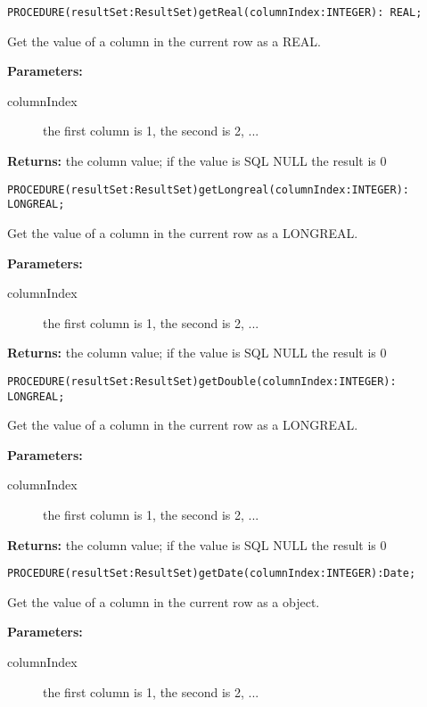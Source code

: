\verb'PROCEDURE(resultSet:ResultSet)getReal(columnIndex:INTEGER): REAL;'

     Get the value of a column in the current row as a REAL. 
     
     {\bf Parameters: } 
\begin{description}
\item[columnIndex] the first column is 1, the second is 2, ... 
\end{description}

     {\bf Returns: } 
          the column value; if the value is SQL NULL the result is 0 


\verb'PROCEDURE(resultSet:ResultSet)getLongreal(columnIndex:INTEGER): LONGREAL;'

     Get the value of a column in the current row as a LONGREAL. 

     {\bf Parameters: } 
\begin{description}
\item[columnIndex] the first column is 1, the second is 2, ... 
\end{description}

     {\bf Returns: } 
          the column value; if the value is SQL NULL the result is 0 


\verb'PROCEDURE(resultSet:ResultSet)getDouble(columnIndex:INTEGER): LONGREAL;'

     Get the value of a column in the current row as a LONGREAL. 

     {\bf Parameters: } 
\begin{description}
\item[columnIndex] the first column is 1, the second is 2, ... 
\end{description}

     {\bf Returns: } 
          the column value; if the value is SQL NULL the result is 0 


\verb'PROCEDURE(resultSet:ResultSet)getDate(columnIndex:INTEGER):Date;'

     Get the value of a column in the current row as a  object. 

     {\bf Parameters: } 
\begin{description}
\item[columnIndex] the first column is 1, the second is 2, ... 
\end{description}


